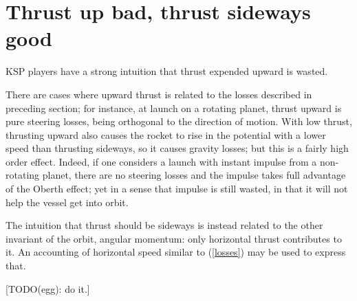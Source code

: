 \documentclass[10pt, a4paper, twoside]{basestyle}
\begin{document}
\section{Thrust up bad, thrust sideways good}
KSP players have a strong intuition that thrust expended upward is wasted.

There are cases where upward thrust is related to the losses described in preceding section;
for instance, at launch on a rotating planet, thrust upward is pure steering losses, being
orthogonal to the direction of motion.
With low thrust, thrusting upward also causes the rocket to rise in the potential with a
lower speed than thrusting sideways, so it causes gravity losses; but this is a fairly
high order effect.
Indeed, if one considers a launch with instant impulse from a non-rotating planet,
there are no steering losses and the impulse takes full advantage of the Oberth effect;
yet in a sense that impulse is still wasted,
in that it will not help the vessel get into orbit.

The intuition that thrust should be sideways is instead related to the other invariant of the orbit,
angular momentum: only horizontal thrust contributes to it.
An accounting of horizontal speed similar to (\ref{losses}) may be used to express that.

[TODO(egg): do it.]
\end{document}
